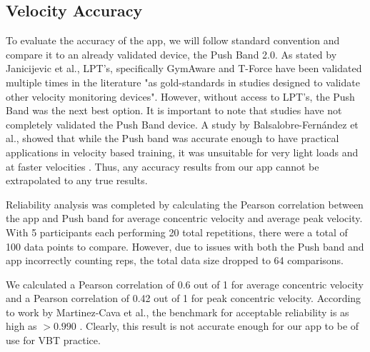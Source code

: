 \documentclass[10pt,twocolumn]{article}
\begin{document}
\subsection{Velocity Accuracy}
To evaluate the accuracy of the app, we will follow standard convention and compare it to an already validated device, the Push Band 2.0.
As stated by Janicijevic et al., LPT's, specifically GymAware and T-Force have been validated multiple times in the literature "as gold-standards in studies designed to validate other velocity monitoring devices"\cite{Janicijevic2021}.
However, without access to LPT's, the Push Band was the next best option.
It is important to note that studies have not completely validated the Push Band device.
A study by Balsalobre-Fernández et al., showed that while the Push band was accurate enough to have practical applications in velocity based training, it was unsuitable for very light loads and at faster velocities \cite{Balsalobre-Fernández2017}.
Thus, any accuracy results from our app cannot be extrapolated to any true results. 
\par

Reliability analysis was completed by calculating the Pearson correlation between the app and Push band for average concentric velocity and average peak velocity.
With 5 participants each performing 20 total repetitions, there were a total of 100 data points to compare.
However, due to issues with both the Push band and app incorrectly counting reps, the total data size dropped to 64 comparisons. \par

We calculated a Pearson correlation of 0.6 out of 1 for average concentric velocity and a Pearson correlation of 0.42 out of 1 for peak concentric velocity.
According to work by Martinez-Cava et al., the benchmark for acceptable reliability is as high as $>0.990$ \cite{Martinez-Cava2020}. 
Clearly, this result is not accurate enough for our app to be of use for VBT practice.\par
\end{document}
